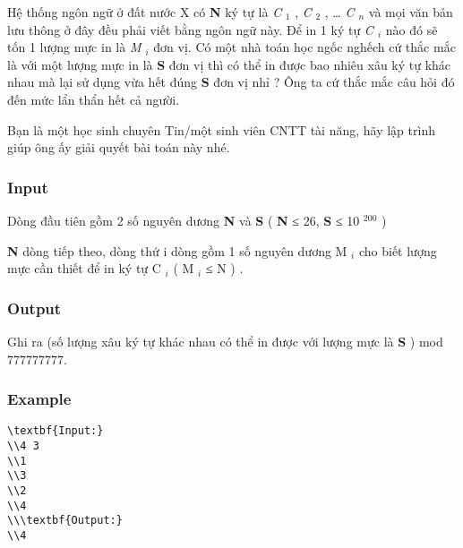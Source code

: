 



   Hệ thống ngôn ngữ ở đất nước X có   \textbf{    N   }   ký tự là   \emph{    C   }$_    1   $   ,   \emph{    C   }$_    2   $   , …   \emph{    C    $_     n    $}   và mọi văn bản lưu thông ở đây đều phải viết bằng ngôn ngữ này. Để in 1 ký tự   \emph{    C    $_     i    $}   nào đó sẽ tốn 1 lượng mực in là   \emph{    M    $_     i    $}   đơn vị. Có một nhà toán học ngốc nghếch cứ thắc mắc là với một lượng mực in là   \textbf{    S   }   đơn vị thì có thể in được bao nhiêu xâu ký tự khác nhau mà lại sử dụng vừa hết đúng   \textbf{    S   }   đơn vị nhỉ ? Ông ta cứ thắc mắc câu hỏi đó đến mức lẩn thẩn hết cả người.  

   Bạn là một học sinh chuyên Tin/một sinh viên CNTT tài năng, hãy lập trình giúp ông ấy giải quyết bài toán này nhé.  

\subsubsection{   Input  }

   Dòng đầu tiên gồm 2 số nguyên dương   \textbf{    N   }   và   \textbf{    S   }   (   \textbf{    N   }   ≤ 26,   \textbf{    S   }   ≤ 10   $^    200   $   )  

\textbf{    N   }   dòng tiếp theo, dòng thứ i dòng gồm 1 số nguyên dương M   $_    i   $   cho biết lượng mực cần thiết để in ký tự C   $_    i   $   ( M   $_    i   $   ≤ N ) .  

\subsubsection{   Output  }

   Ghi ra (số lượng xâu ký tự khác nhau có thể in được với lượng mực là   \textbf{    S   }   ) mod 777777777.  

\subsubsection{   Example  }
\begin{verbatim}
\textbf{Input:}
\\4 3
\\1
\\3
\\2
\\4
\\\textbf{Output:}
\\4\end{verbatim}